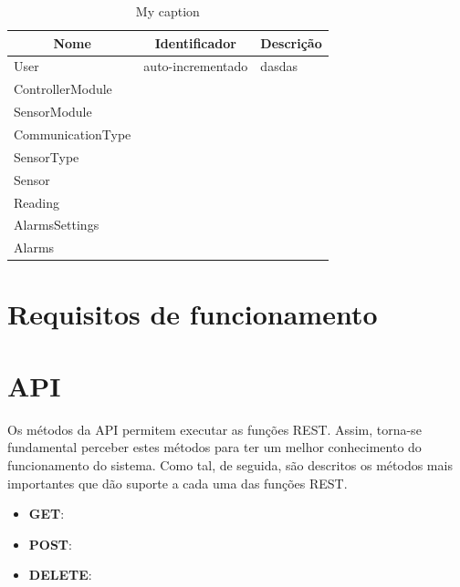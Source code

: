 \newpage

\begin{table}[h]
	\centering
	\begin{tabular}{|l|l|l|}
		\hline
		\multicolumn{1}{|c|}{\textbf{Nome}} & \multicolumn{1}{c|}{\textbf{Identificador}} & \multicolumn{1}{c|}{\textbf{Descrição}} \\ \hline
		User & auto-incrementado & dasdas \\ \hline
		ControllerModule&  &  \\ \hline
		SensorModule&  &  \\ \hline
		CommunicationType&  &  \\ \hline
		SensorType&  &  \\ \hline
		Sensor&  &  \\ \hline
		Reading&  &  \\ \hline
		AlarmsSettings&  &  \\ \hline
		Alarms&  &  \\ \hline
	\end{tabular}
	\caption{My caption}
	\label{my-label}
\end{table}






\newpage

\section{Requisitos de funcionamento}


\newpage


\section{API}

Os métodos da API permitem executar as funções REST. Assim, torna-se fundamental perceber estes métodos para ter um melhor conhecimento do funcionamento do sistema. Como tal, de seguida, são descritos os métodos mais importantes que dão suporte a cada uma das funções REST.

\begin{itemize}
	\item \textbf{GET}: 
	\item \textbf{POST}: 
	\item \textbf{DELETE}: 
\end{itemize}





